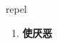 
\begin{frame}
{\huge repel}
\begin{center}
\begin{enumerate}\Large
  \item \textbf{使厌恶}
\end{enumerate}
\end{center}
\end{frame}
